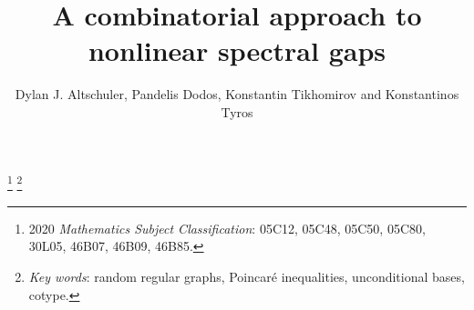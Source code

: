 \documentclass[11pt,leqno]{amsart}
\theoremstyle{remark}
\theoremstyle{plain}
\begin{document}
\title[A combinatorial approach to nonlinear spectral gaps]{A combinatorial approach to nonlinear spectral gaps}

\author{Dylan J. Altschuler, Pandelis Dodos, Konstantin Tikhomirov and Konstantinos Tyros}

\address{Department of Mathematical Sciences, Carnegie Mellon University}

\address{Department of Mathematics, University of Athens, Panepistimiopolis 157 84, Athens, Greece}

\address{Department of Mathematical Sciences, Carnegie Mellon University}

\address{Department of Mathematics, University of Athens, Panepistimiopolis 157 84, Athens, Greece}

\thanks{2020 \textit{Mathematics Subject Classification}: 05C12, 05C48, 05C50, 05C80, 30L05, 46B07, 46B09, 46B85.}
\thanks{\textit{Key words}: random regular graphs, Poincar\'{e} inequalities, unconditional bases, cotype.}

\end{document}
